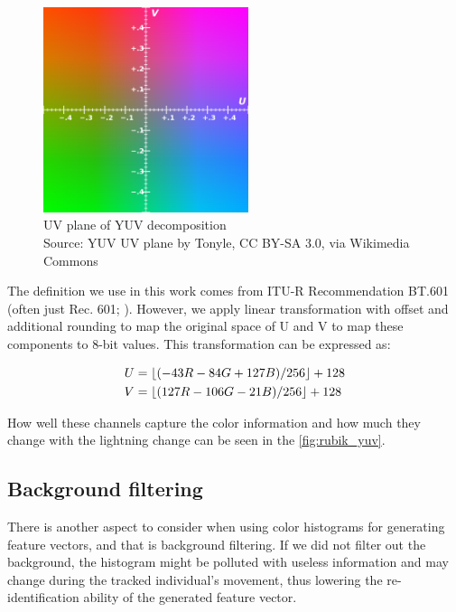 \begin{figure}
    \centering
    \includegraphics[width=6cm]{img/YUV_UV_plane.svg.png}
    \caption[UV plane of YUV decomposition]{UV plane of YUV decomposition\\
    Source: YUV UV plane\protect\footnotemark{} by Tonyle, CC BY-SA 3.0, via Wikimedia Commons \protect\footnotemark{}}
    \label{fig:yuv_decomposition}
\end{figure}
\addtocounter{footnote}{-2}

The definition we use in this work comes from ITU-R Recommendation BT.601
(often just Rec. 601; \cite{bt2011studio}). However, we apply linear
transformation with offset and additional rounding to map the original space of U and V
to map these components to 8-bit values. This transformation can be expressed
as:

\begin{align*}
U &= \lfloor(-43R - 84G + 127B) / 256\rfloor + 128 \\
V &= \lfloor(127R - 106G - 21B) / 256\rfloor + 128
\end{align*}

How well these channels capture the color information and how much they change with the lightning change can be seen in the \autoref{fig:rubik_yuv}.

\subsection{Background filtering}

There is another aspect to consider when using color histograms for generating feature vectors, and that is background filtering. If we did not filter out the background, the histogram might be polluted with useless information and may change during the tracked individual's movement, thus lowering the re-identification ability of the generated feature vector.


